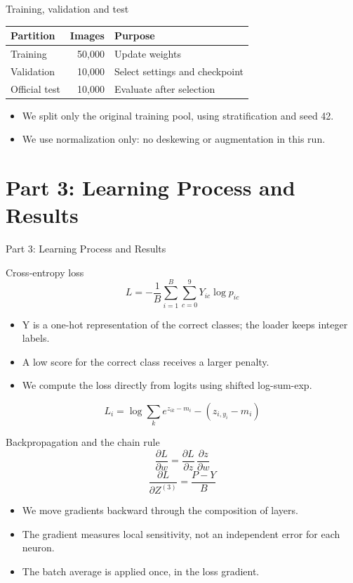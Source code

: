 \documentclass[aspectratio=169,10pt]{beamer}
\begin{document}
\begin{frame}{Training, validation and test}
\begin{center}\begin{tabular}{lrl}\toprule Partition & Images & Purpose\\\midrule Training & 50,000 & Update weights\\ Validation & 10,000 & Select settings and checkpoint\\ Official test & 10,000 & Evaluate after selection\\\bottomrule\end{tabular}\end{center}\begin{itemize}
\item We split only the original training pool, using stratification and seed 42.
\item We use normalization only: no deskewing or augmentation in this run.
\end{itemize}
\end{frame}

\section{Part 3: Learning Process and Results}
\begin{frame}{Part 3: Learning Process and Results}
\tableofcontents[currentsection]\end{frame}

\begin{frame}{Cross-entropy loss}
\[L=-\frac1B\sum_{i=1}^{B}\sum_{c=0}^{9}Y_{ic}\log p_{ic}\]\begin{itemize}
\item Y is a one-hot representation of the correct classes; the loader keeps integer labels.
\item A low score for the correct class receives a larger penalty.
\item We compute the loss directly from logits using shifted log-sum-exp.
\end{itemize}
\[L_i=\log\sum_k e^{z_{ik}-m_i}-(z_{i,y_i}-m_i)\]\end{frame}

\begin{frame}{Backpropagation and the chain rule}
\[\frac{\partial L}{\partial w}=\frac{\partial L}{\partial z}\,\frac{\partial z}{\partial w}\]\[\frac{\partial L}{\partial Z^{(3)}}=\frac{P-Y}{B}\]\begin{itemize}
\item We move gradients backward through the composition of layers.
\item The gradient measures local sensitivity, not an independent error for each neuron.
\item The batch average is applied once, in the loss gradient.
\end{itemize}
\end{frame}
\end{document}
